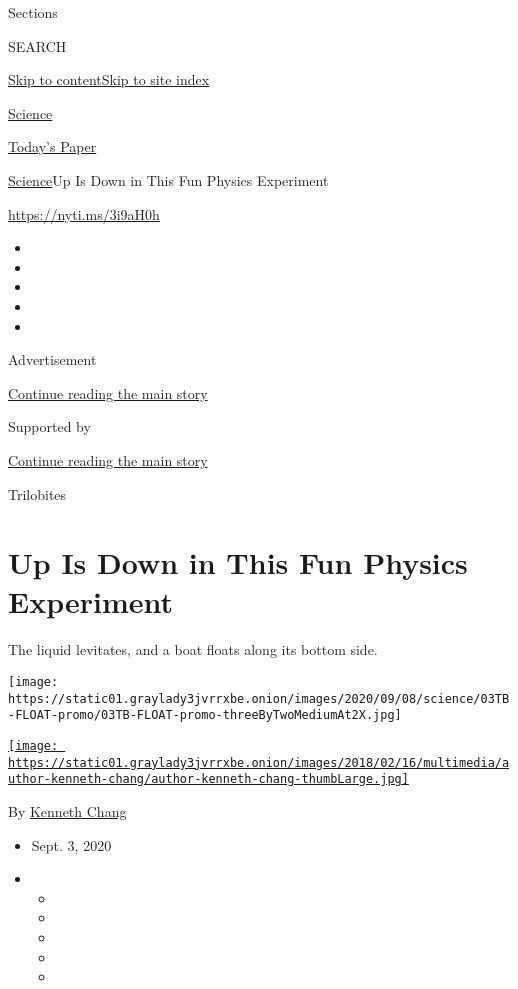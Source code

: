 Sections

SEARCH

\protect\hyperlink{site-content}{Skip to
content}\protect\hyperlink{site-index}{Skip to site index}

\href{https://www.nytimes3xbfgragh.onion/section/science}{Science}

\href{https://myaccount.nytimes3xbfgragh.onion/auth/login?response_type=cookie\&client_id=vi}{}

\href{https://www.nytimes3xbfgragh.onion/section/todayspaper}{Today's
Paper}

\href{/section/science}{Science}\textbar{}Up Is Down in This Fun Physics
Experiment

\url{https://nyti.ms/3i9aH0h}

\begin{itemize}
\item
\item
\item
\item
\item
\end{itemize}

Advertisement

\protect\hyperlink{after-top}{Continue reading the main story}

Supported by

\protect\hyperlink{after-sponsor}{Continue reading the main story}

Trilobites

\hypertarget{up-is-down-in-this-fun-physics-experiment}{%
\section{Up Is Down in This Fun Physics
Experiment}\label{up-is-down-in-this-fun-physics-experiment}}

The liquid levitates, and a boat floats along its bottom side.

\texttt{[image: https://static01.graylady3jvrrxbe.onion/images/2020/09/08/science/03TB-FLOAT-promo/03TB-FLOAT-promo-threeByTwoMediumAt2X.jpg]}

\href{https://www.nytimes3xbfgragh.onion/by/kenneth-chang}{\texttt{[image: https://static01.graylady3jvrrxbe.onion/images/2018/02/16/multimedia/author-kenneth-chang/author-kenneth-chang-thumbLarge.jpg]}}

By \href{https://www.nytimes3xbfgragh.onion/by/kenneth-chang}{Kenneth
Chang}

\begin{itemize}
\item
  Sept. 3, 2020
\item
  \begin{itemize}
  \item
  \item
  \item
  \item
  \item
  \end{itemize}
\end{itemize}

